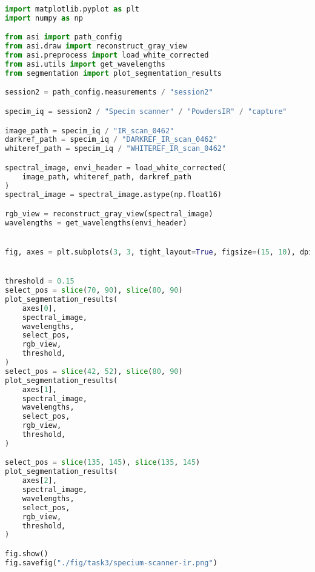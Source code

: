 \begin{lstlisting}[language=python, caption=Segmentation of white poders by Specim Scnaner in infrared wavelengths. Selected areas were used for segmentation, label={code:powder}]
import matplotlib.pyplot as plt
import numpy as np

from asi import path_config
from asi.draw import reconstruct_gray_view
from asi.preprocess import load_white_corrected
from asi.utils import get_wavelengths
from segmentation import plot_segmentation_results

session2 = path_config.measurements / "session2"

specim_iq = session2 / "Specim scanner" / "PowdersIR" / "capture"

image_path = specim_iq / "IR_scan_0462"
darkref_path = specim_iq / "DARKREF_IR_scan_0462"
whiteref_path = specim_iq / "WHITEREF_IR_scan_0462"

spectral_image, envi_header = load_white_corrected(
    image_path, whiteref_path, darkref_path
)
spectral_image = spectral_image.astype(np.float16)

rgb_view = reconstruct_gray_view(spectral_image)
wavelengths = get_wavelengths(envi_header)


fig, axes = plt.subplots(3, 3, tight_layout=True, figsize=(15, 10), dpi=80)


threshold = 0.15
select_pos = slice(70, 90), slice(80, 90)
plot_segmentation_results(
    axes[0],
    spectral_image,
    wavelengths,
    select_pos,
    rgb_view,
    threshold,
)
select_pos = slice(42, 52), slice(80, 90)
plot_segmentation_results(
    axes[1],
    spectral_image,
    wavelengths,
    select_pos,
    rgb_view,
    threshold,
)

select_pos = slice(135, 145), slice(135, 145)
plot_segmentation_results(
    axes[2],
    spectral_image,
    wavelengths,
    select_pos,
    rgb_view,
    threshold,
)

fig.show()
fig.savefig("./fig/task3/specium-scanner-ir.png")
\end{lstlisting}